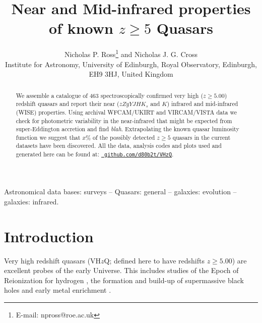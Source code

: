 \documentclass[usenatbib]{mnras}
\begin{document}
\title[Infrared properties Very high-$z$ Quasars]
  {Near and Mid-infrared properties of known $z\geq5$ Quasars}
\author[Ross \& Cross]
{Nicholas P. Ross\thanks{E-mail: npross@roe.ac.uk} and Nicholas J. G. Cross \\ 
Institute for Astronomy, University of Edinburgh, Royal Observatory, Edinburgh, EH9 3HJ, United Kingdom\\ }

\maketitle
\begin{abstract}
We assemble a catalogue of 463 spectroscopically confirmed very high
($z\geq5.00$) redshift quasars and report their near ($zZyYJHK_{s}$
and $K$) infrared and mid-infrared (WISE) properties.  Using archival
WFCAM/UKIRT and VIRCAM/VISTA data we check for photometric variability
in the near-infrared that might be expected from super-Eddington
accretion and find {\it blah}.  Extrapolating the known quasar
luminosity function we suggest that $x$\% of the possibly detected
$z\geq5$ quasars in the current datasets have been discovered.  All
the data, analysis codes and plots used and generated here can be
found at: \href{https://github.com/d80b2t/VHzQ}{\tt
github.com/d80b2t/VHzQ}.
\end{abstract}


\begin{keywords}
Astronomical data bases: surveys -- 
Quasars: general -- 
galaxies: evolution -- 
galaxies: infrared.
\end{keywords}



\section{Introduction}
Very high redshift quasars (VH$z$Q; defined here to have redshifts
$z\geq5.00$) are excellent probes of the early Universe. This includes
studies of the Epoch of Reionization for hydrogen \citep[see e.g.][for
reviews]{Fan2006review, Mortlock2016}, the formation and build-up of
supermassive black holes \citep[e.g., ][]{Rees1984, WyitheLoeb2003,
Volonteri2010, Agarwal2016, Valiante2018, Latif2018, Wise2019} and
early metal enrichment \citep[see e.g., ][]{Simcoe2012, Chen2017,
Bosman2017}.
\end{document}
